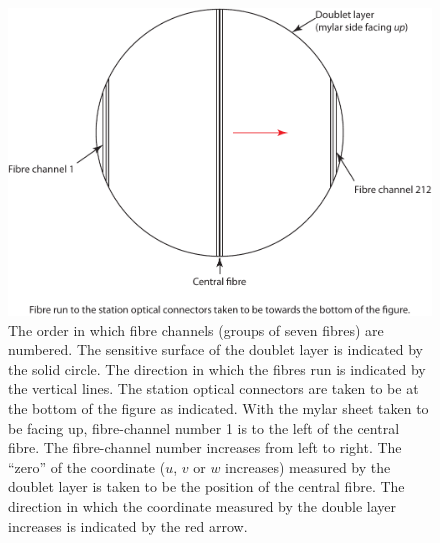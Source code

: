 \begin{figure}
  \begin{center}
    \includegraphics[width=0.75\linewidth]{detectors/tracker/02-Definitions/Figures/fibre-channel-numbering.pdf}
  \end{center}
  \caption{The order in which fibre channels (groups of seven fibres) are numbered. The sensitive surface of the doublet layer is indicated by the solid circle. The direction in which the fibres run is indicated by the vertical lines. The station optical connectors are taken to be at the bottom of the figure as indicated. With the mylar sheet taken to be facing up, fibre-channel number 1 is to the left of the central fibre. The fibre-channel number increases from left to right. The ``zero'' of the coordinate ($u$, $v$ or $w$ increases) measured by the doublet layer is taken to be the position of the central fibre. The direction in which the coordinate measured by the double layer increases is indicated by the red arrow.}
  \label{Fig:FbrChnlNmbrng}
\end{figure}
